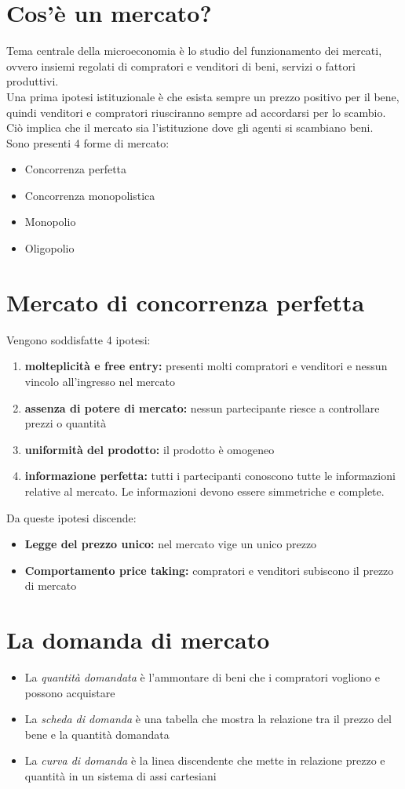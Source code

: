 \documentclass{report}
\begin{document}
	\section{Cos'è un mercato?}
	Tema centrale della microeconomia è lo studio del funzionamento dei mercati, ovvero insiemi regolati di compratori e venditori di beni, servizi o fattori produttivi.\medskip \\Una prima ipotesi istituzionale è che esista sempre un prezzo positivo per il bene, quindi venditori e compratori riusciranno sempre ad accordarsi per lo scambio. Ciò implica che il mercato sia l'istituzione dove gli agenti si scambiano beni.
	\medskip \\Sono presenti 4 forme di mercato:
	\begin{itemize}
		\item Concorrenza perfetta
		\item Concorrenza monopolistica
		\item Monopolio
		\item Oligopolio
	\end{itemize}
	\section{Mercato di concorrenza perfetta}
	Vengono soddisfatte 4 ipotesi:
	\begin{enumerate}
		\item \textbf{molteplicità e free entry:} presenti molti compratori e venditori e nessun vincolo all'ingresso nel mercato
		\item \textbf{assenza di potere di mercato:} nessun partecipante riesce a controllare prezzi o quantità
		\item \textbf{uniformità del prodotto:} il prodotto è omogeneo
		\item \textbf{informazione perfetta:} tutti i partecipanti conoscono tutte le informazioni relative al mercato. Le informazioni devono essere simmetriche e complete.
	\end{enumerate}
	Da queste ipotesi discende:
	\begin{itemize}
		\item \textbf{Legge del prezzo unico:} nel mercato vige un unico prezzo
		\item \textbf{Comportamento price taking:} compratori e venditori subiscono il prezzo di mercato
	\end{itemize}
	\section{La domanda di mercato}
	\begin{itemize}
		\item La \textit{quantità domandata} è l'ammontare di beni che i compratori vogliono e possono acquistare
		\item La \textit{scheda di domanda} è una tabella che mostra la relazione tra il prezzo del bene e la quantità domandata
		\item La \textit{curva di domanda} è la linea discendente che mette in relazione prezzo e quantità in un sistema di assi cartesiani
	\end{itemize}
\end{document}
